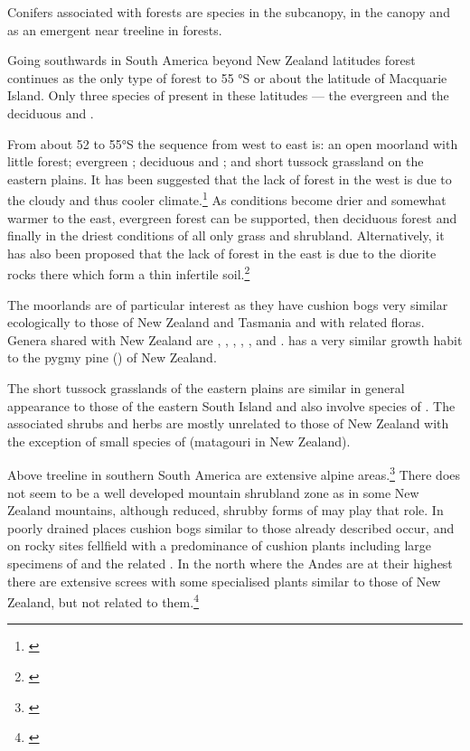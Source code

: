 Conifers associated with  forests are  species in the subcanopy,  in the canopy and  as an emergent near treeline in  forests.

Going southwards in South America beyond New Zealand latitudes  forest continues as the only type of forest to 55 °S or about the latitude of Macquarie Island.
Only three species of  present in these latitudes --- the evergreen  and the deciduous  and .

From about 52 to 55°S the sequence from west to east is: an open moorland with little forest; evergreen ; deciduous  and ; and short tussock grassland on the eastern plains.
It has been suggested that the lack of forest in the west is due to the cloudy and thus cooler climate.\footnote{\cite{mcqueen1976ecology}}
As conditions become drier and somewhat warmer to the east, evergreen  forest can be supported, then deciduous  forest and finally in the driest conditions of all only grass and shrubland.
Alternatively, it has also been proposed that the lack of forest in the east is due to the diorite rocks there which form a thin infertile soil.\footnote{\cite{godley1960botany}}

The moorlands are of particular interest as they have cushion bogs very similar ecologically to those of New Zealand and Tasmania and with related floras.
Genera shared with New Zealand are , , , , ,  and .  has a very similar growth habit to the pygmy pine () of New Zealand.

The short tussock grasslands of the eastern plains are similar in general appearance to those of the eastern South Island and also involve species of .
The associated shrubs and herbs are mostly unrelated to those of New Zealand with the exception of small species of  (matagouri in New Zealand).

Above treeline in southern South America are extensive alpine areas.\footnote{\cite{moore1975alpine}}
There does not seem to be a well developed mountain shrubland zone as in some New Zealand mountains, although reduced, shrubby forms of  may play that role.
In poorly drained places cushion bogs similar to those already described occur, and on rocky sites fellfield with a predominance of cushion plants including large specimens of  and the related .
In the north where the Andes are at their highest there are extensive screes with some specialised plants similar to those of New Zealand, but not related to them.\footnote{\cite{goodspeed1950plant}}

